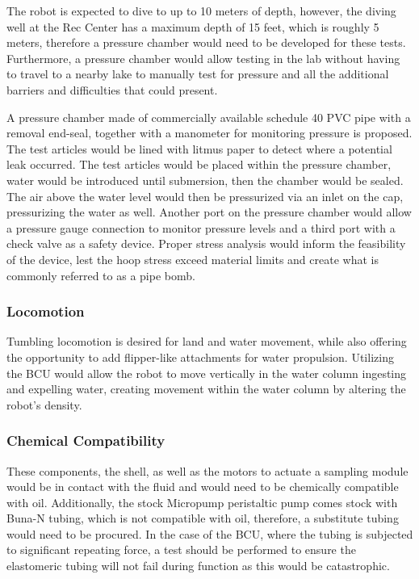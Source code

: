 	The robot is expected to dive to up to 10 meters of depth, however, the diving well at the Rec Center has a maximum depth of 15 feet, which is roughly 5 meters, therefore a pressure chamber would need to be developed for these tests. Furthermore, a pressure chamber would allow testing in the lab without having to travel to a nearby lake to manually test for pressure and all the additional barriers and difficulties that could present.

	A pressure chamber made of commercially available schedule 40 PVC pipe with a removal end-seal, together with a manometer for monitoring pressure is proposed. The test articles would be lined with litmus paper to detect where a potential leak occurred. The test articles would be placed within the pressure chamber, water would be introduced until submersion, then the chamber would be sealed. The air above the water level would then be pressurized via an inlet on the cap, pressurizing the water as well. Another port on the pressure chamber would allow a pressure gauge connection to monitor pressure levels and a third port with a check valve as a safety device. Proper stress analysis would inform the feasibility of the device, lest the hoop stress exceed material limits and create what is commonly referred to as a pipe bomb.  

	\subsubsection{Locomotion}

	Tumbling locomotion is desired for land and water movement, while also offering the opportunity to add flipper-like attachments for water propulsion. Utilizing the BCU would allow the robot to move vertically in the water column ingesting and expelling water, creating movement within the water column by altering the robot's density. 


	\subsubsection{Chemical Compatibility}

	These components, the shell, as well as the motors to actuate a sampling module would be in contact with the fluid and would need to be chemically compatible with oil. Additionally, the stock Micropump peristaltic pump comes stock with Buna-N tubing, which is not compatible with oil, therefore, a substitute tubing would need to be procured. In the case of the BCU, where the tubing is subjected to significant repeating force, a test should be performed to ensure the elastomeric tubing will not fail during function as this would be catastrophic. 


